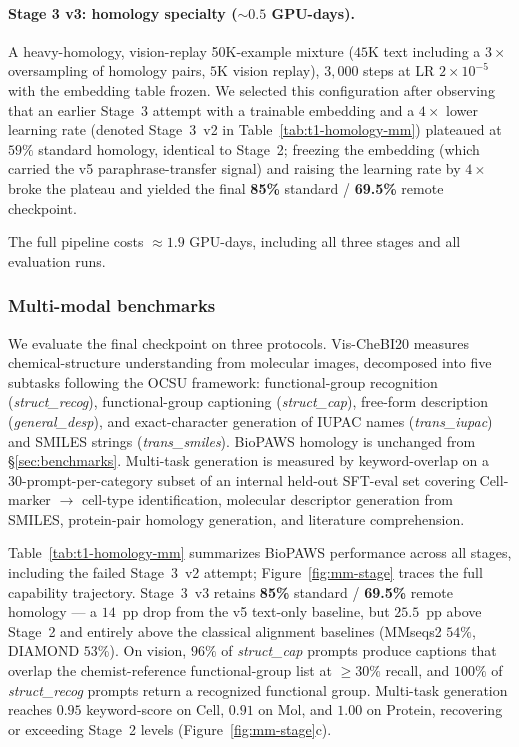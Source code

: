\documentclass[11pt]{article}
\begin{document}
\paragraph{Stage 3 v3: homology specialty ($\sim 0.5$ GPU-days).} A heavy-homology, vision-replay 50K-example mixture ($45$K text including a $3\times$ oversampling of homology pairs, $5$K vision replay), $3{,}000$ steps at LR $2\!\times\!10^{-5}$ with the embedding table frozen. We selected this configuration after observing that an earlier Stage~3 attempt with a trainable embedding and a $4\times$ lower learning rate (denoted Stage~3~v2 in Table~\ref{tab:t1-homology-mm}) plateaued at $59\%$ standard homology, identical to Stage~2; freezing the embedding (which carried the v5 paraphrase-transfer signal) and raising the learning rate by $4\times$ broke the plateau and yielded the final \textbf{85\%} standard / \textbf{69.5\%} remote checkpoint.

The full pipeline costs $\approx 1.9$ GPU-days, including all three stages and all evaluation runs.

\subsubsection{Multi-modal benchmarks}

We evaluate the final checkpoint on three protocols. Vis-CheBI20 \citep{fan2025ocsu} measures chemical-structure understanding from molecular images, decomposed into five subtasks following the OCSU framework: functional-group recognition (\textit{struct\_recog}), functional-group captioning (\textit{struct\_cap}), free-form description (\textit{general\_desp}), and exact-character generation of IUPAC names (\textit{trans\_iupac}) and SMILES strings (\textit{trans\_smiles}). BioPAWS homology is unchanged from \S\ref{sec:benchmarks}. Multi-task generation is measured by keyword-overlap on a 30-prompt-per-category subset of an internal held-out SFT-eval set covering Cell-marker $\rightarrow$ cell-type identification, molecular descriptor generation from SMILES, protein-pair homology generation, and literature comprehension.

Table~\ref{tab:t1-homology-mm} summarizes BioPAWS performance across all stages, including the failed Stage~3~v2 attempt; Figure~\ref{fig:mm-stage} traces the full capability trajectory. Stage~3~v3 retains \textbf{85\%} standard / \textbf{69.5\%} remote homology --- a $14$~pp drop from the v5 text-only baseline, but $25.5$~pp above Stage~2 and entirely above the classical alignment baselines (MMseqs2 $54\%$, DIAMOND $53\%$). On vision, $96\%$ of \textit{struct\_cap} prompts produce captions that overlap the chemist-reference functional-group list at $\geq 30\%$ recall, and $100\%$ of \textit{struct\_recog} prompts return a recognized functional group. Multi-task generation reaches $0.95$ keyword-score on Cell, $0.91$ on Mol, and $1.00$ on Protein, recovering or exceeding Stage~2 levels (Figure~\ref{fig:mm-stage}c).
\end{document}
